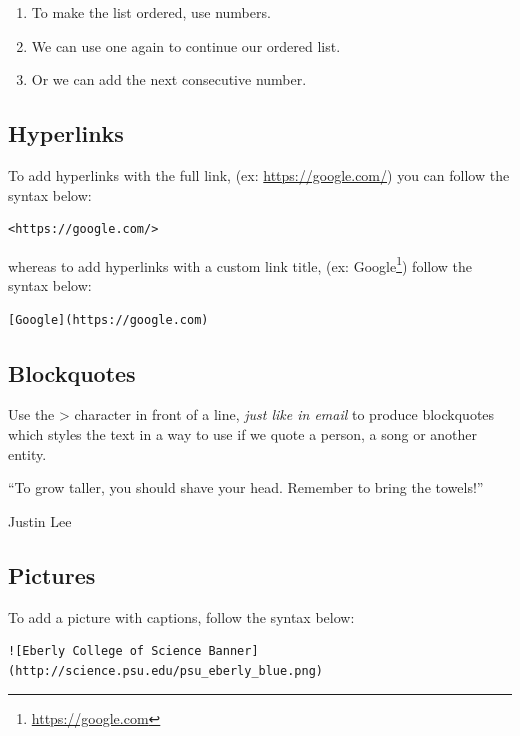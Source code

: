 \documentclass[12pt,]{krantz}
\providecommand{\tightlist}{%
  \setlength{\itemsep}{0pt}\setlength{\parskip}{0pt}}
\renewenvironment{quote}{\begin{VF}}{\end{VF}}
\renewcommand{\href}[2]{#2\footnote{\url{#1}}}
\begin{document}
\begin{enumerate}
\def\labelenumi{\arabic{enumi}.}
\tightlist
\item
  To make the list ordered, use numbers.
\item
  We can use one again to continue our ordered list.
\item
  Or we can add the next consecutive number.
\end{enumerate}

\subsection{Hyperlinks}\label{hyperlinks}

To add hyperlinks with the full link, (ex: \url{https://google.com/})
you can follow the syntax below:

\begin{verbatim}
<https://google.com/>
\end{verbatim}

whereas to add hyperlinks with a custom link title, (ex:
\href{https://google.com}{Google}) follow the syntax below:

\begin{verbatim}
[Google](https://google.com)
\end{verbatim}

\subsection{Blockquotes}\label{blockquotes}

Use the \textgreater{} character in front of a line, \emph{just like in
email} to produce blockquotes which styles the text in a way to use if
we quote a person, a song or another entity.

\begin{quote}
``To grow taller, you should shave your head. Remember to bring the
towels!''

Justin Lee
\end{quote}

\subsection{Pictures}\label{pictures}

To add a picture with captions, follow the syntax below:

\begin{verbatim}
![Eberly College of Science Banner](http://science.psu.edu/psu_eberly_blue.png)
\end{verbatim}
\end{document}
